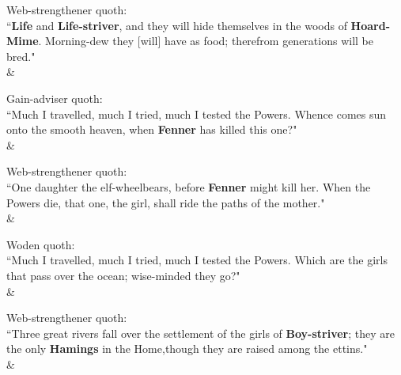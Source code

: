 \begin{Rightside}
\begin{astanza}%
\bv Web-strengthener quoth: \\ “\textbf{Life} and \textbf{Life-striver}, and they will hide themselves in the woods of \textbf{Hoard-Mime}\footnotemark[85]. Morning-dew they [will] have as food; therefrom generations will be bred." \\
\&\end{astanza}%

\begin{astanza}%
\bv Gain-adviser quoth: \\ “Much I travelled, much I tried, much I tested the Powers. Whence comes sun onto the smooth heaven, when \textbf{Fenner} has killed this one\footnotemark[90]?" \\
\&\end{astanza}%

\begin{astanza}%
\bv Web-strengthener quoth: \\ “One daughter the elf-wheel\footnotemark[95] bears, before \textbf{Fenner} might kill her. When the Powers die, that one, the girl, shall ride the paths of the mother." \\
\&\end{astanza}%

\begin{astanza}%
\bv Woden quoth: \\ “Much I travelled, much I tried, much I tested the Powers. Which are the girls that pass over the ocean; wise-minded they go?" \\
\&\end{astanza}%

\begin{astanza}%
\bv Web-strengthener quoth: \\ “Three great rivers fall over the settlement of the girls of \textbf{Boy-striver}; they are the only \textbf{Hamings} in the Home,\footnotemark[99] though they are raised among the ettins\footnotemark[100]." \\
\&\end{astanza}%


\end{Rightside}
